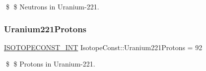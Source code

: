 \$ \$ Neutrons in Uranium-\/221. \mbox{\label{group___isotope_const-_uranium-_u221_gaaff6fefba5eee0452dadbe75fa95d5cc}} 
\subsubsection{\texorpdfstring{Uranium221\+Protons}{Uranium221Protons}}
{\footnotesize\ttfamily \mbox{\hyperlink{group___isotope_const-_macros_ga5f18360b3e99483a35c32d789e62621c}{I\+S\+O\+T\+O\+P\+E\+C\+O\+N\+S\+T\+\_\+\+I\+NT}} Isotope\+Const\+::\+Uranium221\+Protons = 92}

\$ \$ Protons in Uranium-\/221. 